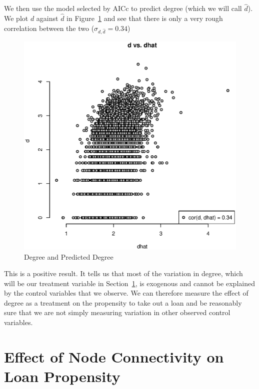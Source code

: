 \documentclass[11pt, fleqn]{article}
\begin{document}
We then use the model selected by AICc to predict degree (which we will call $\hat{d}$). We plot $d$ against $\hat{d}$ in Figure~\ref{fig:d_vs_dhat} and see that there is only a very rough correlation between the two ($\sigma_{d,\hat{d}}=0.34$)

\begin{figure}[!htb]
  \centering
  \includegraphics[scale=.5]{d_vs_dhat.eps}
  \caption{Degree and Predicted Degree}
  \label{fig:d_vs_dhat}
\end{figure}

This is a positive result. It tells us that most of the variation in degree, which will be our treatment variable in Section~\ref{sec:model}, is exogenous and cannot be explained by the control variables that we observe. We can therefore measure the effect of degree as a treatment on the propensity to take out a loan and be reasonably sure that we are not simply measuring variation in other observed control variables.

\section{Effect of Node Connectivity on Loan Propensity}
\label{sec:model}
\end{document}
